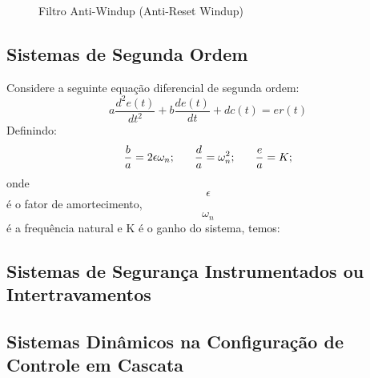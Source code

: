 \begin{enumerate}
\begin{enumerate}
\begin{figure}[h]
                            \caption{Filtro Anti-Windup (Anti-Reset Windup)}
                            \label{fig:filtro_anti_windup}
                        \end{figure}
        \end{enumerate}
\end{enumerate}
\newpage

\subsection{Sistemas de Segunda Ordem}
\hspace{4ex}Considere a seguinte equação diferencial de segunda ordem:
    \[a\frac{d^2e(t)}{dt^2}+b\frac{de(t)}{dt}+dc(t)=er(t)\]
Definindo:
    \[\frac{b}{a}=2\epsilon\omega_n; \hspace{4ex} \frac{d}{a}=\omega^2_n; \hspace{4ex} \frac{e}{a}=K;\]
onde \[\epsilon\] é o fator de amortecimento, \[\omega_n\] é a frequência natural e K é o ganho do sistema, temos:


\subsection{Sistemas de Segurança Instrumentados ou Intertravamentos}\hspace{4ex}

\subsection{Sistemas Dinâmicos na Configuração de Controle em Cascata}\hspace{4ex}